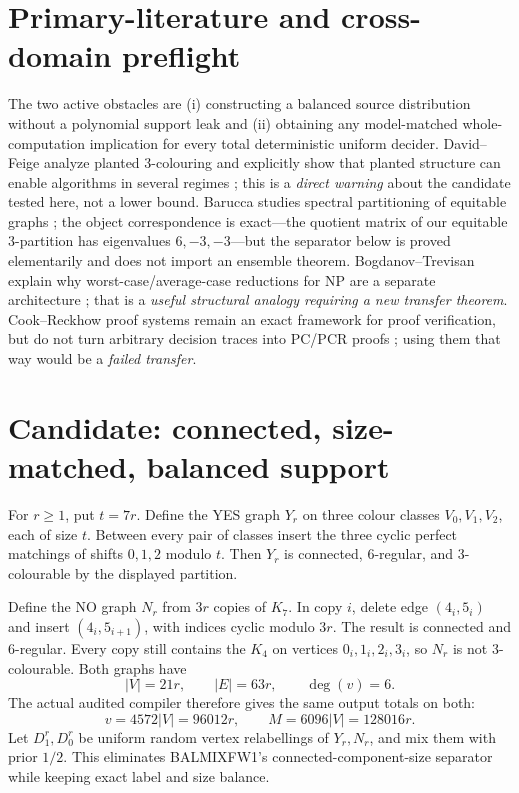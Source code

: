 \documentclass[11pt]{article}
\begin{document}
\section{Primary-literature and cross-domain preflight}
The two active obstacles are (i) constructing a balanced source distribution
without a polynomial support leak and (ii) obtaining any model-matched
whole-computation implication for every total deterministic uniform decider.
David--Feige analyze planted 3-colouring and explicitly show that planted
structure can enable algorithms in several regimes \cite{davidfeige}; this is
a \emph{direct warning} about the candidate tested here, not a lower bound.
Barucca studies spectral partitioning of equitable graphs \cite{barucca}; the
object correspondence is exact---the quotient matrix of our equitable
3-partition has eigenvalues $6,-3,-3$---but the separator below is proved
elementarily and does not import an ensemble theorem.  Bogdanov--Trevisan
explain why worst-case/average-case reductions for NP are a separate
architecture \cite{bt}; that is a \emph{useful structural analogy requiring a
new transfer theorem}.  Cook--Reckhow proof systems remain an exact framework
for proof verification, but do not turn arbitrary decision traces into PC/PCR
proofs \cite{cr}; using them that way would be a \emph{failed transfer}.

\section{Candidate: connected, size-matched, balanced support}
For $r\ge1$, put $t=7r$.  Define the YES graph $Y_r$ on three colour classes
$V_0,V_1,V_2$, each of size $t$.  Between every pair of classes insert the
three cyclic perfect matchings of shifts $0,1,2$ modulo $t$.  Then $Y_r$ is
connected, 6-regular, and 3-colourable by the displayed partition.

Define the NO graph $N_r$ from $3r$ copies of $K_7$.  In copy $i$, delete edge
$(4_i,5_i)$ and insert $(4_i,5_{i+1})$, with indices cyclic modulo $3r$.
The result is connected and 6-regular.  Every copy still contains the $K_4$
on vertices $0_i,1_i,2_i,3_i$, so $N_r$ is not 3-colourable.  Both graphs have
\[
 |V|=21r,\qquad |E|=63r,\qquad \deg(v)=6.                 \tag{2}
\]
The actual audited compiler therefore gives the same output totals on both:
\[
 v=4572|V|=96012r,\qquad M=6096|V|=128016r.              \tag{3}
\]
Let $D_1^r,D_0^r$ be uniform random vertex relabellings of $Y_r,N_r$, and mix
them with prior $1/2$.  This eliminates BALMIXFW1's connected-component-size
separator while keeping exact label and size balance.
\end{document}

